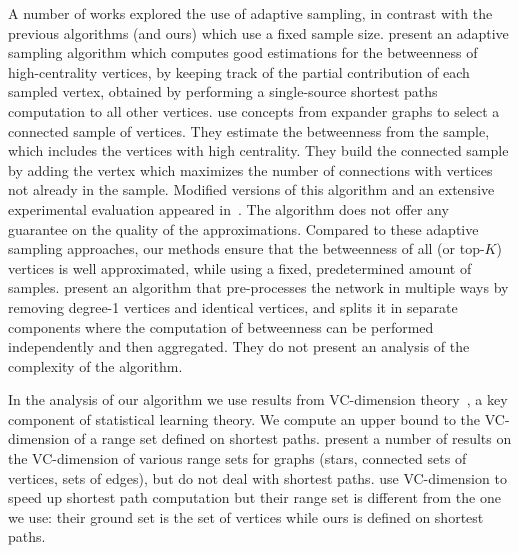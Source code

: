 A number of works explored
the use of adaptive sampling, in contrast with the previous algorithms (and
ours) which use a fixed sample size. \citet{BaderKMM07} present an adaptive
sampling algorithm which computes good estimations for the betweenness of
high-centrality vertices, by keeping track of the partial contribution of each
sampled vertex, obtained by performing a single-source shortest paths
computation to all other vertices. \citet{MaiyaBW10} use concepts from expander
graphs to select a connected sample of vertices. They estimate the betweenness
from the sample, which includes the vertices with high centrality. They build
the connected sample by adding the vertex which maximizes the number of
connections with vertices not already in the sample. Modified versions
of this algorithm and an extensive experimental evaluation appeared
in~\citep{LimMRTB11}. The algorithm does not offer any guarantee on the quality
of the approximations. Compared to these adaptive sampling approaches, our
methods ensure that the betweenness of all (or top-$K$) vertices is well
approximated, while using a fixed, predetermined amount of samples.
\citet{SaryuceSKC13} present an algorithm that pre-processes the network in
multiple ways by removing degree-1 vertices and identical vertices, and splits it
in separate components where the computation of betweenness can be performed
independently and then aggregated. They do not present an analysis of the
complexity of the algorithm. 

In the analysis of our algorithm we use results from VC-dimension
theory~\citep{VapnikC71}, a key component of statistical learning theory. We
compute an upper bound to the VC-dimension of a range set defined on shortest
paths. \citet{KranakisKRUW97} present a number of results on the VC-dimension of
various range sets for graphs (stars, connected sets of vertices, sets of
edges), but do not deal with shortest paths. \citet{AbrahamDFGW11} use
VC-dimension to speed up shortest path computation but their range set is
different from the one we use: their ground set is the set of vertices while
ours is defined on shortest paths.

